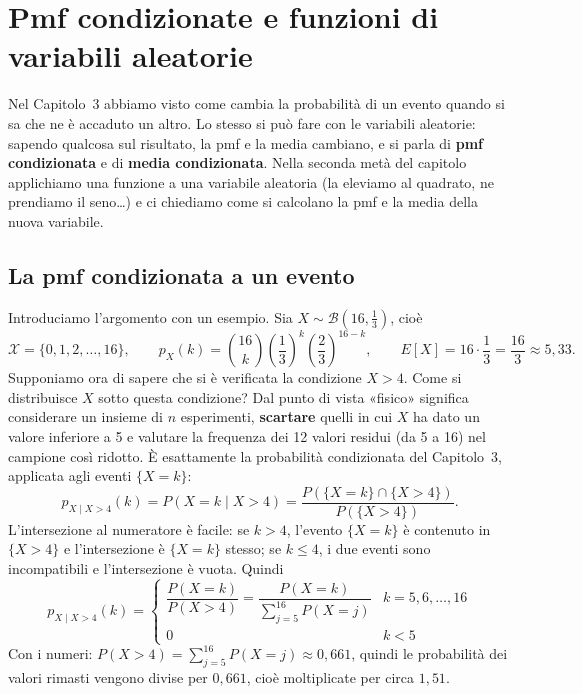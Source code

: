 \chapter{Pmf condizionate e funzioni di variabili aleatorie}

Nel Capitolo~3 abbiamo visto come cambia la probabilità di un evento quando si sa che ne è accaduto un altro. Lo
stesso si può fare con le variabili aleatorie: sapendo qualcosa sul risultato, la pmf e la media cambiano, e si
parla di \textbf{pmf condizionata} e di \textbf{media condizionata}. Nella seconda metà del capitolo applichiamo una
funzione a una variabile aleatoria (la eleviamo al quadrato, ne prendiamo il seno\ldots) e ci chiediamo come si
calcolano la pmf e la media della nuova variabile.

\section{La pmf condizionata a un evento}

Introduciamo l'argomento con un esempio. Sia $X \sim \mathcal{B}\left(16, \frac13\right)$, cioè
\[
  \mathcal{X} = \{0, 1, 2, \ldots, 16\} , \qquad
  p_X(k) = \binom{16}{k} \left(\frac13\right)^k \left(\frac23\right)^{16-k} , \qquad
  E[X] = 16 \cdot \frac13 = \frac{16}{3} \approx 5{,}33 .
\]
Supponiamo ora di sapere che si è verificata la condizione $X > 4$. Come si distribuisce $X$ sotto questa condizione?
Dal punto di vista «fisico» significa considerare un insieme di $n$ esperimenti, \textbf{scartare} quelli in cui $X$
ha dato un valore inferiore a 5 e valutare la frequenza dei 12 valori residui (da 5 a 16) nel campione così ridotto.
È esattamente la probabilità condizionata del Capitolo~3, applicata agli eventi $\{X = k\}$:
\[ p_{X \mid X > 4}(k) = P(X = k \mid X > 4) = \frac{P(\{X = k\} \cap \{X > 4\})}{P(\{X > 4\})} . \]
L'intersezione al numeratore è facile: se $k > 4$, l'evento $\{X = k\}$ è contenuto in $\{X > 4\}$ e l'intersezione è
$\{X = k\}$ stesso; se $k \leq 4$, i due eventi sono incompatibili e l'intersezione è vuota. Quindi
\[
  p_{X \mid X > 4}(k) =
  \begin{cases}
    \dfrac{P(X = k)}{P(X > 4)} = \dfrac{P(X = k)}{\sum_{j=5}^{16} P(X = j)} & k = 5, 6, \ldots, 16 \\[3mm]
    0 & k < 5
  \end{cases}
\]
Con i numeri: $P(X > 4) = \sum_{j=5}^{16} P(X = j) \approx 0{,}661$, quindi le probabilità dei valori rimasti vengono
divise per $0{,}661$, cioè moltiplicate per circa $1{,}51$.

